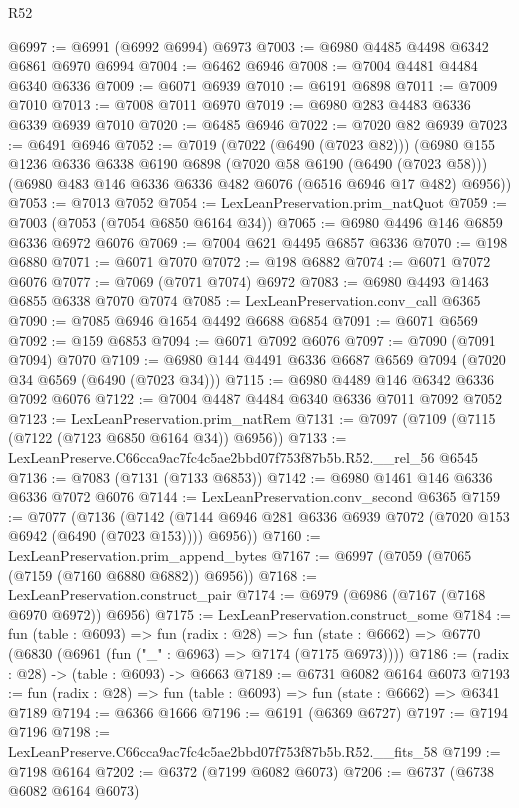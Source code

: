 \begin{lexlean}{R52}
\begin{coremodule}
@6997 := @6991 (@6992 @6994) @6973
@7003 := @6980 @4485 @4498 @6342 @6861 @6970 @6994
@7004 := @6462 @6946
@7008 := @7004 @4481 @4484 @6340 @6336
@7009 := @6071 @6939
@7010 := @6191 @6898
@7011 := @7009 @7010
@7013 := @7008 @7011 @6970
@7019 := @6980 @283 @4483 @6336 @6339 @6939 @7010
@7020 := @6485 @6946
@7022 := @7020 @82 @6939
@7023 := @6491 @6946
@7052 := @7019
    (@7022 (@6490 (@7023 @82)))
    (@6980
      @155
      @1236
      @6336
      @6338
      @6190
      @6898
      (@7020 @58 @6190 (@6490 (@7023 @58)))
      (@6980 @483 @146 @6336 @6336 @482 @6076 (@6516 @6946 @17 @482) @6956))
@7053 := @7013 @7052
@7054 := LexLeanPreservation.prim_natQuot
@7059 := @7003 (@7053 (@7054 @6850 @6164 @34))
@7065 := @6980 @4496 @146 @6859 @6336 @6972 @6076
@7069 := @7004 @621 @4495 @6857 @6336
@7070 := @198 @6880
@7071 := @6071 @7070
@7072 := @198 @6882
@7074 := @6071 @7072 @6076
@7077 := @7069 (@7071 @7074) @6972
@7083 := @6980 @4493 @1463 @6855 @6338 @7070 @7074
@7085 := LexLeanPreservation.conv_call @6365
@7090 := @7085 @6946 @1654 @4492 @6688 @6854
@7091 := @6071 @6569
@7092 := @159 @6853
@7094 := @6071 @7092 @6076
@7097 := @7090 (@7091 @7094) @7070
@7109 := @6980 @144 @4491 @6336 @6687 @6569 @7094 (@7020 @34 @6569 (@6490 (@7023 @34)))
@7115 := @6980 @4489 @146 @6342 @6336 @7092 @6076
@7122 := @7004 @4487 @4484 @6340 @6336 @7011 @7092 @7052
@7123 := LexLeanPreservation.prim_natRem
@7131 := @7097 (@7109 (@7115 (@7122 (@7123 @6850 @6164 @34)) @6956))
@7133 := LexLeanPreserve.C66cca9ac7fc4c5ae2bbd07f753f87b5b.R52.__rel_56 @6545
@7136 := @7083 (@7131 (@7133 @6853))
@7142 := @6980 @1461 @146 @6336 @6336 @7072 @6076
@7144 := LexLeanPreservation.conv_second @6365
@7159 := @7077
    (@7136
      (@7142 (@7144 @6946 @281 @6336 @6939 @7072 (@7020 @153 @6942 (@6490 (@7023 @153)))) @6956))
@7160 := LexLeanPreservation.prim_append_bytes
@7167 := @6997 (@7059 (@7065 (@7159 (@7160 @6880 @6882)) @6956))
@7168 := LexLeanPreservation.construct_pair
@7174 := @6979 (@6986 (@7167 (@7168 @6970 @6972)) @6956)
@7175 := LexLeanPreservation.construct_some
@7184 := fun (table : @6093) =>
  fun (radix : @28) =>
  fun (state : @6662) => @6770 (@6830 (@6961 (fun ("_" : @6963) => @7174 (@7175 @6973))))
@7186 := (radix : @28) -> (table : @6093) -> @6663
@7189 := @6731 @6082 @6164 @6073
@7193 := fun (radix : @28) => fun (table : @6093) => fun (state : @6662) => @6341 @7189
@7194 := @6366 @1666
@7196 := @6191 (@6369 @6727)
@7197 := @7194 @7196
@7198 := LexLeanPreserve.C66cca9ac7fc4c5ae2bbd07f753f87b5b.R52.__fits_58
@7199 := @7198 @6164
@7202 := @6372 (@7199 @6082 @6073)
@7206 := @6737 (@6738 @6082 @6164 @6073)

\end{coremodule}
\end{lexlean}

